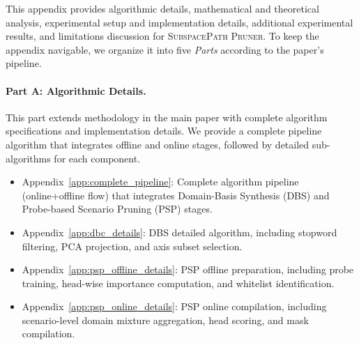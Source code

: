 \newpage
\appendix
\onecolumn

\label{app:overview}

This appendix provides algorithmic details, mathematical and theoretical analysis, experimental setup and implementation details, additional experimental results, and limitations discussion for \textsc{SubspacePath Pruner}.
To keep the appendix navigable, we organize it into five \emph{Parts} according to the paper's pipeline.

\paragraph{Part A: Algorithmic Details.}
This part extends methodology in the main paper with complete algorithm specifications and implementation details.
We provide a complete pipeline algorithm that integrates offline and online stages, followed by detailed sub-algorithms for each component.
\begin{itemize}
    \item Appendix~\ref{app:complete_pipeline}: Complete algorithm pipeline (online+offline flow) that integrates Domain-Basis Synthesis (DBS) and Probe-based Scenario Pruning (PSP) stages.
    \item Appendix~\ref{app:dbc_details}: DBS detailed algorithm, including stopword filtering, PCA projection, and axis subset selection.
    \item Appendix~\ref{app:psp_offline_details}: PSP offline preparation, including probe training, head-wise importance computation, and whitelist identification.
    \item Appendix~\ref{app:psp_online_details}: PSP online compilation, including scenario-level domain mixture aggregation, head scoring, and mask compilation.
\end{itemize}

